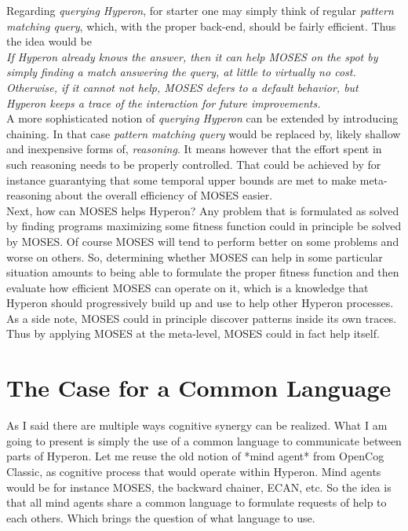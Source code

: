 \documentclass[]{report}
\begin{document}
Regarding \emph{querying Hyperon}, for starter one may simply think of
regular \emph{pattern matching query}, which, with the proper
back-end, should be fairly efficient.  Thus the idea would be\\

\emph{If Hyperon already knows the answer, then it can help MOSES on
the spot by simply finding a match answering the query, at little to
virtually no cost.  Otherwise, if it cannot not help, MOSES defers to
a default behavior, but Hyperon keeps a trace of the interaction for
future improvements.}\\

A more sophisticated notion of \emph{querying Hyperon} can be extended
by introducing chaining.  In that case \emph{pattern matching query}
would be replaced by, likely shallow and inexpensive forms of,
\emph{reasoning}.  It means however that the effort spent in such
reasoning needs to be properly controlled.  That could be achieved by
for instance guarantying that some temporal upper bounds are met to
make meta-reasoning about the overall efficiency of MOSES easier.\\

Next, how can MOSES helps Hyperon? Any problem that is formulated as
solved by finding programs maximizing some fitness function could in
principle be solved by MOSES.  Of course MOSES will tend to perform
better on some problems and worse on others.  So, determining whether
MOSES can help in some particular situation amounts to being able to
formulate the proper fitness function and then evaluate how efficient
MOSES can operate on it, which is a knowledge that Hyperon should
progressively build up and use to help other Hyperon processes.  As a
side note, MOSES could in principle discover patterns inside its own
traces.  Thus by applying MOSES at the meta-level, MOSES could in fact
help itself.

\section{The Case for a Common Language}

As I said there are multiple ways cognitive synergy can be realized.
What I am going to present is simply the use of a common language to
communicate between parts of Hyperon.  Let me reuse the old notion of
*mind agent* from OpenCog Classic, as cognitive process that would
operate within Hyperon.  Mind agents would be for instance MOSES, the
backward chainer, ECAN, etc.  So the idea is that all mind agents
share a common language to formulate requests of help to each others.
Which brings the question of what language to use.
\end{document}
